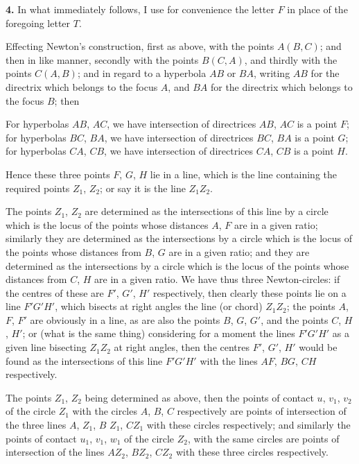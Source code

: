 \documentclass[11pt,a4paper]{book}
\begin{document}
\textbf{4.} In what immediately follows, I use for convenience the letter $F$ in place of the foregoing letter $T$.

Effecting Newton's construction, first as above, with the points $A(B, C)$; and then in like manner, secondly with the points $B(C, A)$, and thirdly with the points $C(A, B)$; and in regard to a hyperbola $AB$ or $BA$, writing $AB$ for the directrix which belongs to the focus $A$, and $BA$ for the directrix which belongs to the focus $B$; then

For hyperbolas $AB$, $AC$, we have intersection of directrices $AB$, $AC$ is a point $F$; for hyperbolas $BC$, $BA$, we have intersection of directrices $BC$, $BA$ is a point $G$; for hyperbolas $CA$, $CB$, we have intersection of directrices $CA$, $CB$ is a point $H$.

Hence these three points $F$, $G$, $H$ lie in a line, which is the line containing the required points $Z_1$, $Z_2$; or say it is the line $Z_1 Z_2$.

The points $Z_1$, $Z_2$ are determined as the intersections of this line by a circle which is the locus of the points whose distances $A$, $F$ are in a given ratio; similarly they are determined as the intersections by a circle which is the locus of the points whose distances from $B$, $G$ are in a given ratio; and they are determined as the intersections by a circle which is the locus of the points whose distances from $C$, $H$ are in a given ratio. We have thus three Newton-circles: if the centres of these are $F'$, $G'$, $H'$ respectively, then clearly these points lie on a line $F'G'H'$, which bisects at right angles the line (or chord) $Z_1 Z_2$; the points $A$, $F$, $F'$ are obviously in a line, as are also the points $B$, $G$, $G'$, and the points $C$, $H$, $H'$; or (what is the same thing) considering for a moment the lines $F'G'H'$ as a given line bisecting $Z_1 Z_2$ at right angles, then the centres $F'$, $G'$, $H'$ would be found as the intersections of this line $F'G'H'$ with the lines $AF$, $BG$, $CH$ respectively.

The points $Z_1$, $Z_2$ being determined as above, then the points of contact $u$, $v_1$, $v_2$ of the circle $Z_1$ with the circles $A$, $B$, $C$ respectively are points of intersection of the three lines $A$, $Z_1$, $B$ $Z_1$, $CZ_1$ with these circles respectively; and similarly the points of contact $u_1$, $v_1$, $w_1$ of the circle $Z_2$, with the same circles are points of intersection of the lines $AZ_2$, $BZ_2$, $CZ_2$ with these three circles respectively.
\end{document}
